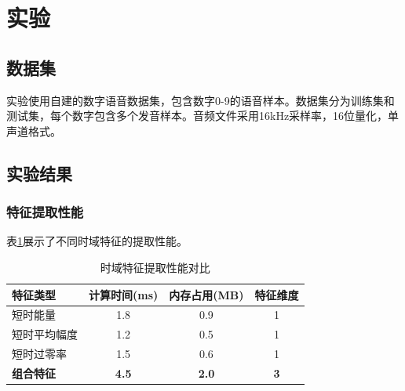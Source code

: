 \documentclass[sigconf,nonacm]{acmart}
\begin{document}
\section{实验}

\subsection{数据集}

实验使用自建的数字语音数据集，包含数字0-9的语音样本。数据集分为训练集和测试集，每个数字包含多个发音样本。音频文件采用16kHz采样率，16位量化，单声道格式。



\subsection{实验结果}

\subsubsection{特征提取性能}

表\ref{tab:feature_performance}展示了不同时域特征的提取性能。

\begin{table}[htbp]
\caption{时域特征提取性能对比}
\label{tab:feature_performance}
\begin{center}
\begin{tabular}{lccc}
\toprule
\textbf{特征类型} & \textbf{计算时间(ms)} & \textbf{内存占用(MB)} & \textbf{特征维度} \\
\midrule
短时能量 & 1.8 & 0.9 & 1 \\
短时平均幅度 & 1.2 & 0.5 & 1 \\
短时过零率 & 1.5 & 0.6 & 1 \\
\midrule
\textbf{组合特征} & \textbf{4.5} & \textbf{2.0} & \textbf{3} \\
\bottomrule
\end{tabular}
\end{center}
\end{table}
\end{document}

